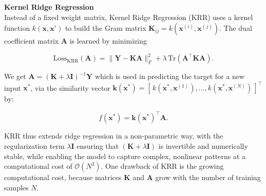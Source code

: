 \textbf{Kernel Ridge Regression}\\ %
Instead of a fixed weight matrix, Kernel Ridge Regression (KRR) uses a kernel function $k(\mathbf{x}, \mathbf{x}')$ to build the Gram matrix $\mathbf{K}_{ij} = k(\mathbf{x}^{(i)}, \mathbf{x}^{(j)})$. The dual coefficient matrix $\mathbf{A}$ is learned by minimizing

\begin{equation}
\label{eq:kernel_ridge_loss}
\mathrm{Loss}_{\mathrm{KRR}}(\mathbf{A})
= \|\mathbf{Y} - \mathbf{K}\mathbf{A}\|_F^2 + \lambda\,\mathrm{Tr}(\mathbf{A}^\top \mathbf{K}\mathbf{A}).
\end{equation}

We get $\mathbf{A} = (\mathbf{K} + \lambda \mathbf{I})^{-1} \mathbf{Y}$ which is used in predicting the target for a new input $\mathbf{x}^*$, via the similarity vector $\mathbf{k}(\mathbf{x}^*) = [\,k(\mathbf{x}^*,\mathbf{x}^{(1)}),\dots,k(\mathbf{x}^*,\mathbf{x}^{(N)})\,]^\top$ by:

\begin{equation}
\label{eq:kernel_ridge_predict}
f(\mathbf{x}^*) = \mathbf{k}(\mathbf{x}^*)^\top \mathbf{A}.
\end{equation}

KRR thus extends ridge regression in a non-parametric way, with the regularization term $\lambda \mathbf{I}$ ensuring that $(\mathbf{K} + \lambda \mathbf{I})$ is invertible and numerically stable, while enabling the model to capture complex, nonlinear patterns at a computational cost of $\mathcal{O}(N^3)$. One drawback of KRR is the growing computational cost,  because matrices $\mathbf{K}$ and $\mathbf{A}$ grow with the number of training samples $N$.


